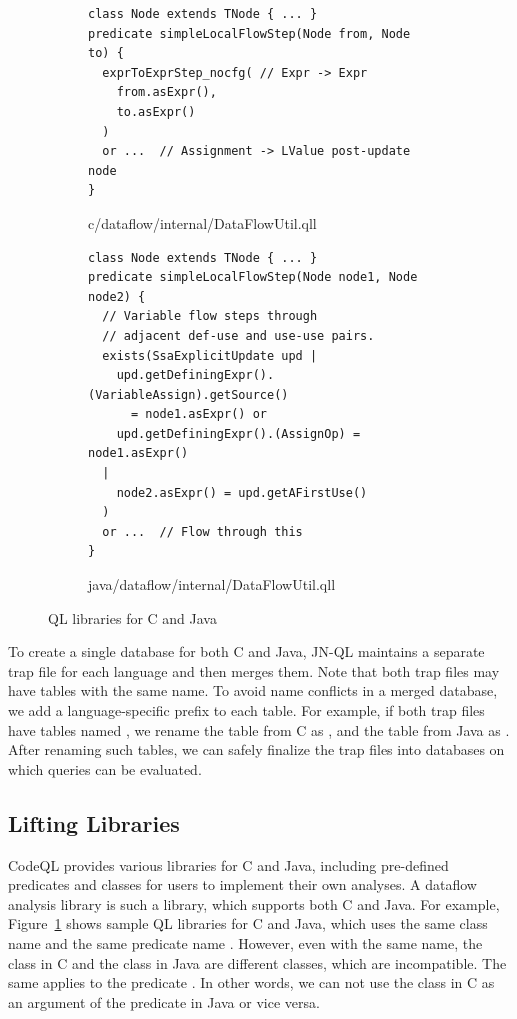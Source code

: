 \begin{figure}[t]
  \centering
  \vspace{2mm}
  \begin{subfigure}[t]{0.5\textwidth}
\begin{lstlisting}[style=codeql,xleftmargin=2.5em]
class Node extends TNode { ... }
predicate simpleLocalFlowStep(Node from, Node to) {
  exprToExprStep_nocfg( // Expr -> Expr
    from.asExpr(),
    to.asExpr()
  )
  or ...  // Assignment -> LValue post-update node
}
\end{lstlisting}
    \vspace*{-.5em}
    \caption{c/dataflow/internal/DataFlowUtil.qll}
  \end{subfigure}
  \begin{subfigure}[t]{0.5\textwidth}
\begin{lstlisting}[style=codeql,xleftmargin=2.5em]
class Node extends TNode { ... }
predicate simpleLocalFlowStep(Node node1, Node node2) {
  // Variable flow steps through
  // adjacent def-use and use-use pairs.
  exists(SsaExplicitUpdate upd |
    upd.getDefiningExpr().(VariableAssign).getSource()
      = node1.asExpr() or
    upd.getDefiningExpr().(AssignOp) = node1.asExpr()
  |
    node2.asExpr() = upd.getAFirstUse()
  )
  or ...  // Flow through this
}
\end{lstlisting}
    \vspace*{-.5em}
    \caption{java/dataflow/internal/DataFlowUtil.qll}
  \end{subfigure}
  \vspace*{-.5em}
  \caption{QL libraries for C and Java}
  \label{fig:qll}
\end{figure}

To create a single database for both C and Java, JN-QL maintains
a separate trap file for each language and then merges them.
Note that both trap files may have tables with the same name.
To avoid name conflicts in a merged database, we add a
language-specific prefix to each table.
For example, if both trap files have tables named ,
we rename the table from C as ,
and the table from Java as .
After renaming such tables, we can safely finalize the trap files into
databases on which queries can be evaluated.

\subsection{Lifting Libraries}

CodeQL provides various libraries for C and Java, including
pre-defined predicates and classes for users to implement their own analyses.
A dataflow analysis library is such a library, which supports both C and Java.
For example, Figure~\ref{fig:qll} shows sample QL libraries for C and Java,
which uses the same class name  and the same predicate
name .
However, even with the same name, the class  in C and the
class  in Java are different classes, which are incompatible.
The same applies to the predicate .
In other words, we can not use the class  in C as an
argument of the predicate  in Java or vice versa.

